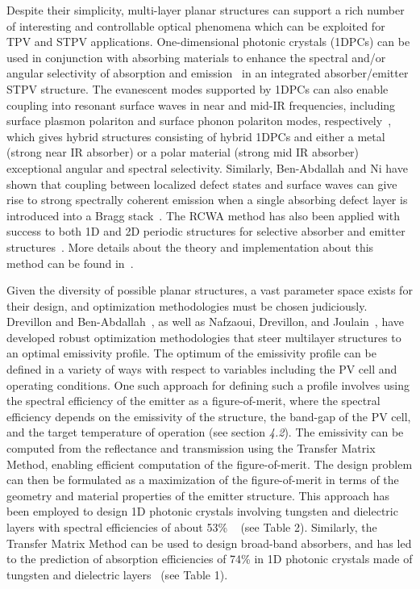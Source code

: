 \documentclass[review]{elsarticle}
\begin{document}
Despite their simplicity, multi-layer planar structures can support a rich number of interesting and controllable optical phenomena
which can be exploited for TPV and STPV applications.  One-dimensional photonic crystals (1DPCs) can be used in conjunction with absorbing
materials to enhance the spectral and/or angular selectivity of absorption and emission~\cite{paper1_ref4} in an integrated absorber/emitter STPV
structure.  The evanescent modes supported by 1DPCs
can also enable coupling into resonant surface waves in near and mid-IR frequencies, including surface plasmon polariton and surface
phonon polariton modes, respectively~\cite{LZ_JApplPhys_2006}, which gives hybrid 
structures consisting of hybrid 1DPCs and either a metal (strong near IR
absorber) or a polar material (strong mid IR absorber) 
exceptional angular and spectral selectivity.  Similarly, Ben-Abdallah and Ni have shown that coupling
between localized defect states and surface waves can give rise to strong spectrally coherent emission when a single absorbing defect layer is
introduced into a Bragg stack~\cite{BN_JApplPhys_2005}. The RCWA method has also been applied with success to both 1D and 2D periodic structures for selective absorber and emitter structures~\cite{A13, RCWA3}.  More details about the theory and implementation about this method can be found in~\cite{RCWA1, RCWA2}. 

Given the diversity of possible planar structures, a vast parameter space exists for their design, and optimization methodologies must
be chosen judiciously.  Drevillon and Ben-Abdallah~\cite{DB_JApplPhys_2007}, as well as Nafzaoui, Drevillon, and Joulain~\cite{NDJ_JApplPhys_2012},
have developed robust optimization 
methodologies that steer multilayer structures to an optimal emissivity profile. The optimum of the emissivity
profile can be defined in a variety of ways with respect to variables including the PV cell and operating conditions.
One such approach for defining such a profile involves using the spectral efficiency of the emitter as a figure-of-merit,
where the spectral efficiency depends on the emissivity of the structure, the band-gap of the PV cell, and the target 
temperature of operation (see section {\it 4.2}).  
The emissivity can be computed from the reflectance
and transmission using the Transfer Matrix Method, enabling efficient computation of the figure-of-merit.  The design problem can then be
formulated as a maximization of the figure-of-merit in terms of the geometry and material properties of the emitter structure.
This approach has been employed to design 1D photonic crystals involving tungsten and dielectric layers with spectral efficiencies of 
about 53\% ~\cite{SKY_JPE_2015} (see Table 2).  Similarly, the Transfer 
Matrix Method can be used to design broad-band absorbers, 
and has led to the prediction of 
absorption efficiencies of 74\% in 1D photonic crystals made of tungsten 
and dielectric layers~\cite{SKY_JPE_2015} (see Table 1).
\end{document}
